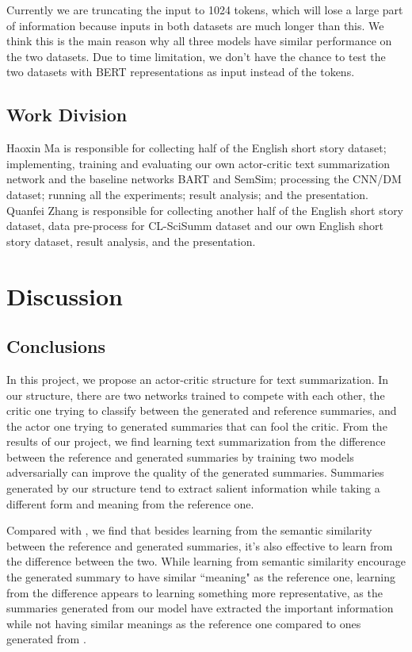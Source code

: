 \documentclass[11pt,a4paper]{article}
\begin{document}
Currently we are truncating the input to 1024 tokens, which will lose a large part of information because inputs in both datasets are much longer than this. We think this is the main reason why all three models have similar performance on the two datasets. Due to time limitation, we don't have the chance to test the two datasets with BERT representations as input instead of the tokens.

\subsection{Work Division}

Haoxin Ma is responsible for collecting half of the English short story dataset; implementing, training and evaluating our own actor-critic text summarization network and the baseline networks BART and SemSim; processing the CNN/DM dataset; running all the experiments; result analysis; and the presentation. Quanfei Zhang is responsible for collecting another half of the English short story dataset, data pre-process for CL-SciSumm dataset and our own English short story dataset, result analysis, and the presentation.

\section{Discussion}
\label{discuss}
\subsection{Conclusions}

In this project, we propose an actor-critic structure for text summarization. In our structure, there are two networks trained to compete with each other, the critic one trying to classify between the generated and reference summaries, and the actor one trying to generated summaries that can fool the critic. From the results of our project, we find learning text summarization from the difference between the reference and generated summaries by training two models adversarially can improve the quality of the generated summaries. Summaries generated by our structure tend to extract salient information while taking a different form and meaning from the reference one.

Compared with \cite{yoon2020learning}, we find that besides learning from the semantic similarity between the reference and generated summaries, it's also effective to learn from the difference between the two. While learning from semantic similarity encourage the generated summary to have similar ``meaning" as the reference one, learning from the difference appears to learning something more representative, as the summaries generated from our model have extracted the important information while not having similar meanings as the reference one compared to ones generated from \cite{yoon2020learning}.
\end{document}
